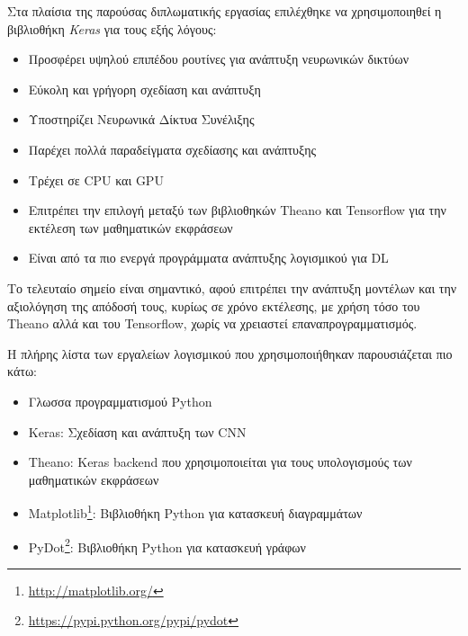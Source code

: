 Στα πλαίσια της παρούσας διπλωματικής εργασίας επιλέχθηκε να χρησιμοποιηθεί
η βιβλιοθήκη \emph{Keras} για τους εξής λόγους:
\begin{itemize}
  \item{Προσφέρει υψηλού επιπέδου ρουτίνες για ανάπτυξη νευρωνικών δικτύων}
  \item{Εύκολη και γρήγορη σχεδίαση και ανάπτυξη}
  \item{Υποστηρίζει Νευρωνικά Δίκτυα Συνέλιξης}
  \item{Παρέχει πολλά παραδείγματα σχεδίασης και ανάπτυξης}
  \item{Τρέχει σε CPU και GPU}
  \item{Επιτρέπει την επιλογή μεταξύ των βιβλιοθηκών Theano και Tensorflow
    για την εκτέλεση των μαθηματικών εκφράσεων}
  \item{Είναι από τα πιο ενεργά προγράμματα ανάπτυξης λογισμικού για DL}
\end{itemize}

Το τελευταίο σημείο είναι σημαντικό, αφού επιτρέπει την ανάπτυξη μοντέλων και
την αξιολόγηση της απόδοσή τους, κυρίως σε χρόνο εκτέλεσης,
με χρήση τόσο του Theano αλλά και του Tensorflow, χωρίς να χρειαστεί
επαναπρογραμματισμός.

Η πλήρης λίστα των εργαλείων λογισμικού που χρησιμοποιήθηκαν παρουσιάζεται πιο κάτω:
\begin{itemize}
  \item{Γλωσσα προγραμματισμού Python}
  \item{Keras: Σχεδίαση και ανάπτυξη των CNN}
  \item{Theano: Keras backend που χρησιμοποιείται για τους υπολογισμούς των μαθηματικών εκφράσεων}
  \item{Matplotlib\footnote{\url{http://matplotlib.org/}}: Βιβλιοθήκη Python για κατασκευή διαγραμμάτων}
  \item{PyDot\footnote{\url{https://pypi.python.org/pypi/pydot}}: Βιβλιοθήκη Python για κατασκευή γράφων}
\end{itemize}
